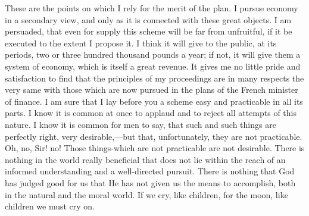 These are the points on which I rely for the merit of the plan. I pursue economy in a secondary view, and only as it is connected with these great objects. I am persuaded, that even for supply this scheme will be far from unfruitful, if it be executed to the extent I propose it. I think it will give to the public, at its periods, two or three hundred thousand pounds a year; if not, it will give them a system of economy, which is itself a great revenue. It gives me no little pride and satisfaction to find that the principles of my proceedings are in many respects the very same with those which are now pursued in the plans of the French minister of finance. I am sure that I lay before you a scheme easy and practicable in all its parts. I know it is common at once to applaud and to reject all attempts of this nature. I know it is common for men to say, that such and such things are perfectly right, very desirable,—but that, unfortunately, they are not practicable. Oh, no, Sir! no! Those things-which are not practicable are not desirable. There is nothing in the world really beneficial that does not lie within the reach of an informed understanding and a well-directed pursuit. There is nothing that God has judged good for us that He has not given us the means to accomplish, both in the natural and the moral world. If we cry, like children, for the moon, like children we must cry on.

